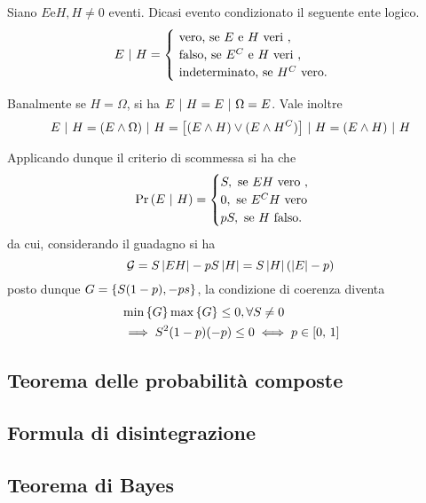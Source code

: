 \documentclass{subfiles}
\begin{document}
\begin{Definition*}
    Siano \(E \text{e} H, H \neq 0\) eventi.
    Dicasi evento condizionato il seguente ente logico.
    \[E \Given H = \begin{cases}
            \text{vero, se} E \text{e} H \text{veri},      \\
            \text{falso, se} E^{C} \text{e} H \text{veri}, \\
            \text{indeterminato, se} H^{C} \text{vero.}
        \end{cases}\]
\end{Definition*}

Banalmente se \(H = \Omega\), si ha \(E \operatorname{\, \vert \,} H = E \operatorname{\, \vert \,} \Omega = E\).
Vale inoltre
\[
    E \operatorname{\, \vert \,} H = (E \land \Omega) \operatorname{\, \vert \,} H = \left[(E \land H) \lor (E \land H^{C})\right] \operatorname{\, \vert \,} H = (E \land H) \operatorname{\, \vert \,} H
\]

Applicando dunque il criterio di scommessa si ha che
\[
    \Prob{E}[H] = \begin{cases}
        S, \text{se} EH \text{vero},    \\
        0, \text{se} E^{C}H \text{vero} \\
        pS, \text{se} H \text{falso.}
    \end{cases}\]
da cui, considerando il guadagno si ha
\[
    \mathcal{G} = S \left\vert {EH} \right\vert - pS\left\vert {H} \right\vert = S\left\vert {H} \right\vert (\left\vert {E} \right\vert - p)
\]
posto dunque \(G = \Set{S(1 - p), -ps}\), la condizione di coerenza diventa
\[\begin{aligned}
         & \Min*{G}\Max*{G} \le 0, \forall S \neq 0                 \\
         & \implies S^{2}(1 - p)(-p) \le 0 \iff p \in \Range*{0}{1}
    \end{aligned}\]

\subsection{Teorema delle probabilità composte}


\subsection{Formula di disintegrazione}


\subsection{Teorema di Bayes}

\end{document}
